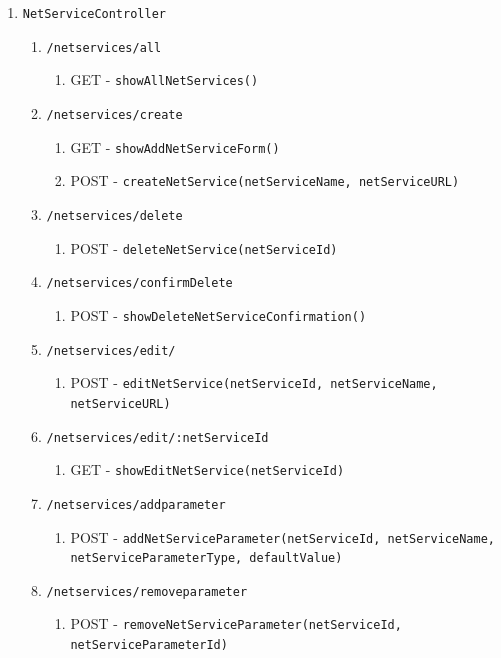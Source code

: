 \documentclass[12pt,DIV14,BCOR10mm,a4paper,parskip=half-,headsepline,headinclude,english,ngerman,bibliography=totocnumbered]{scrreprt}
\begin{document}
\begin{enumerate}
\begin{enumerate}
    \item \texttt{NetServiceController}
    \begin{enumerate}
      \item \texttt{/netservices/all}
        \begin{enumerate}
          \item GET - \texttt{showAllNetServices()}
        \end{enumerate}
      \item \texttt{/netservices/create}
        \begin{enumerate}
          \item GET - \texttt{showAddNetServiceForm()}
          \item POST - \texttt{createNetService(netServiceName, netServiceURL)}
        \end{enumerate}
      \item \texttt{/netservices/delete}
        \begin{enumerate}
          \item POST - \texttt{deleteNetService(netServiceId)}
        \end{enumerate}
      \item \texttt{/netservices/confirmDelete}
        \begin{enumerate}
          \item POST - \texttt{showDeleteNetServiceConfirmation()}
        \end{enumerate}
        \item \texttt{/netservices/edit/}
        \begin{enumerate}
          \item POST - \texttt{editNetService(netServiceId, netServiceName, netServiceURL)}
        \end{enumerate}
      \item \texttt{/netservices/edit/:netServiceId}
        \begin{enumerate}
          \item GET - \texttt{showEditNetService(netServiceId)}
        \end{enumerate}
      \item \texttt{/netservices/addparameter}
        \begin{enumerate}
          \item POST - \texttt{addNetServiceParameter(netServiceId, netServiceName, netServiceParameterType, defaultValue)}
        \end{enumerate}
      \item \texttt{/netservices/removeparameter}
        \begin{enumerate}
          \item POST - \texttt{removeNetServiceParameter(netServiceId, netServiceParameterId)}
        \end{enumerate}



\end{enumerate}
\end{enumerate}
\end{enumerate}
\end{document}

